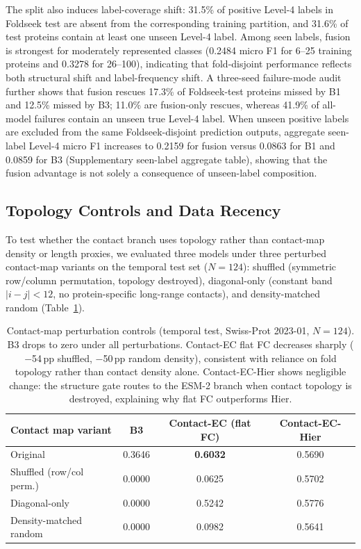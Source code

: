 \documentclass[numbered,contemporary,mediumone]{oup-authoring-template}
\begin{document}
The split also induces label-coverage shift: 31.5\% of positive Level-4 labels
in Foldseek test are absent from the corresponding training partition, and
31.6\% of test proteins contain at least one unseen Level-4 label. Among seen
labels, fusion is strongest for moderately represented classes (0.2484 micro F1
for 6--25 training proteins and 0.3278 for 26--100), indicating that
fold-disjoint performance reflects both structural shift and label-frequency
shift. A three-seed failure-mode audit further shows that fusion rescues 17.3\%
of Foldseek-test proteins missed by B1 and 12.5\% missed by B3; 11.0\% are
fusion-only rescues, whereas 41.9\% of all-model failures contain an unseen true
Level-4 label. When unseen positive labels are excluded from the same
Foldseek-disjoint prediction outputs, aggregate seen-label Level-4 micro F1
increases to 0.2159 for fusion versus 0.0863 for B1 and 0.0859 for B3
(Supplementary seen-label aggregate table), showing that the fusion advantage is
not solely a consequence of unseen-label composition.

\subsection{Topology Controls and Data Recency}

To test whether the contact branch uses topology rather than contact-map density or
length proxies, we evaluated three models under three perturbed contact-map variants on the
temporal test set ($N=124$): shuffled (symmetric row/column permutation, topology
destroyed), diagonal-only (constant band $|i-j|<12$, no protein-specific
long-range contacts), and density-matched random
(Table~\ref{tab:perturb}).

\begin{table}[!htbp]
\centering
\caption{Contact-map perturbation controls (temporal test, Swiss-Prot 2023-01,
$N=124$). B3 drops to zero under all perturbations.
Contact-EC flat FC decreases sharply ($-$54\,pp shuffled, $-$50\,pp random density),
consistent with reliance on fold topology rather than contact density alone.
Contact-EC-Hier shows negligible change: the structure gate routes to the ESM-2
branch when contact topology is destroyed, explaining why flat FC outperforms Hier.}
\label{tab:perturb}
\setlength{\tabcolsep}{5pt}
\begin{tabular}{lccc}
\toprule
Contact map variant & B3 & Contact-EC (flat FC) & Contact-EC-Hier \\
\midrule
Original                & 0.3646 & \textbf{0.6032} & 0.5690 \\
Shuffled (row/col perm.)& 0.0000 & 0.0625           & 0.5702 \\
Diagonal-only           & 0.0000 & 0.5242           & 0.5776 \\
Density-matched random  & 0.0000 & 0.0982           & 0.5641 \\
\bottomrule
\end{tabular}
\end{table}
\end{document}
